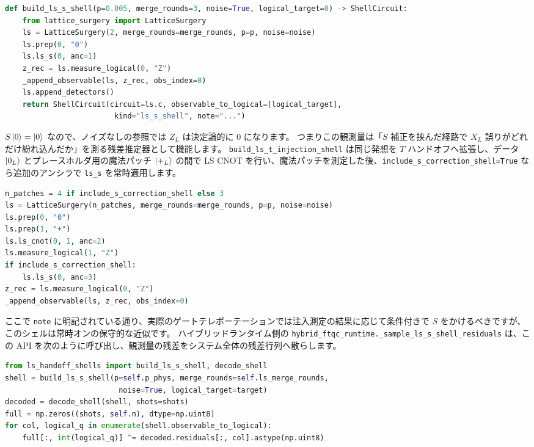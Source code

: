\begin{lstlisting}[language=Python, caption={build\_ls\_s\_shell（src/stages/01\_mpp/src/ftqc/ls\_handoff\_shells.py）}]
def build_ls_s_shell(p=0.005, merge_rounds=3, noise=True, logical_target=0) -> ShellCircuit:
    from lattice_surgery import LatticeSurgery
    ls = LatticeSurgery(2, merge_rounds=merge_rounds, p=p, noise=noise)
    ls.prep(0, "0")
    ls.ls_s(0, anc=1)
    z_rec = ls.measure_logical(0, "Z")
    _append_observable(ls, z_rec, obs_index=0)
    ls.append_detectors()
    return ShellCircuit(circuit=ls.c, observable_to_logical=[logical_target],
                         kind="ls_s_shell", note="...")
\end{lstlisting}

$S\ket{0}=\ket{0}$ なので、ノイズなしの参照では $Z_L$ は決定論的に $0$ になります。
つまりこの観測量は「$S$ 補正を挟んだ経路で $X_L$ 誤りがどれだけ紛れ込んだか」を測る残差推定器として機能します。
\texttt{build\_ls\_t\_injection\_shell} は同じ発想を $T$ ハンドオフへ拡張し、データ $\ket{0_L}$ とプレースホルダ用の魔法パッチ $\ket{+_L}$ の間で LS CNOT を行い、魔法パッチを測定した後、\texttt{include\_s\_correction\_shell=True} なら追加のアンシラで \texttt{ls\_s} を常時適用します。

\begin{lstlisting}[language=Python, caption={build\_ls\_t\_injection\_shell の骨格（src/stages/01\_mpp/src/ftqc/ls\_handoff\_shells.py）}]
n_patches = 4 if include_s_correction_shell else 3
ls = LatticeSurgery(n_patches, merge_rounds=merge_rounds, p=p, noise=noise)
ls.prep(0, "0")
ls.prep(1, "+")
ls.ls_cnot(0, 1, anc=2)
ls.measure_logical(1, "Z")
if include_s_correction_shell:
    ls.ls_s(0, anc=3)
z_rec = ls.measure_logical(0, "Z")
_append_observable(ls, z_rec, obs_index=0)
\end{lstlisting}

ここで \texttt{note} に明記されている通り、実際のゲートテレポーテーションでは注入測定の結果に応じて条件付きで $S$ をかけるべきですが、このシェルは常時オンの保守的な近似です。
ハイブリッドランタイム側の \texttt{hybrid\_ftqc\_runtime.\_sample\_ls\_s\_shell\_residuals} は、この API を次のように呼び出し、観測量の残差をシステム全体の残差行列へ散らします。

\begin{lstlisting}[language=Python, caption={ランタイムからの呼び出し（src/stages/01\_mpp/src/ftqc/hybrid\_ftqc\_runtime.py）}]
from ls_handoff_shells import build_ls_s_shell, decode_shell
shell = build_ls_s_shell(p=self.p_phys, merge_rounds=self.ls_merge_rounds,
                          noise=True, logical_target=target)
decoded = decode_shell(shell, shots=shots)
full = np.zeros((shots, self.n), dtype=np.uint8)
for col, logical_q in enumerate(shell.observable_to_logical):
    full[:, int(logical_q)] ^= decoded.residuals[:, col].astype(np.uint8)
\end{lstlisting}

